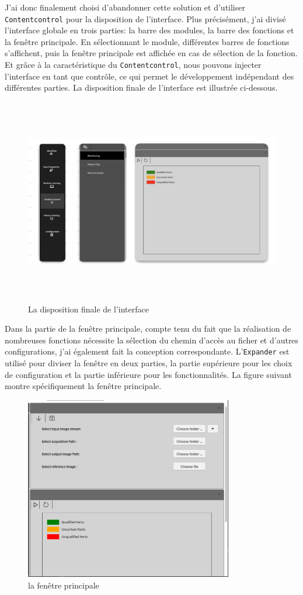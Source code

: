 J'ai donc finalement choisi d'abandonner cette solution et d'utiliser 
\texttt{Contentcontrol} pour la disposition de l'interface. Plus précisément, j'ai divisé l'interface globale en trois parties: la barre des modules, la barre des fonctions et la fenêtre principale. En sélectionnant le module, différentes barres de fonctions s'affichent, puis la fenêtre principale est affichée en cas de sélection de la fonction. Et grâce à la caractéristique du \texttt{Contentcontrol}, nous pouvons injecter l'interface en tant que contrôle, ce qui permet le développement indépendant des différentes parties. La disposition finale de l'interface est illustrée ci-dessous.
\begin{figure}[H]
    \centering
    \includegraphics[height=9cm]{ressources/images/PowerEye_Disposition.jpg}
    \caption{ La disposition finale de l’interface}
\end{figure}

Dans la partie de la fenêtre principale, compte tenu du fait que la réalisation de nombreuses fonctions nécessite la sélection du chemin d'accès au ficher et d'autres configurations, j'ai également fait la conception correspondante. L'\texttt{Expander} est utilisé pour diviser la fenêtre en deux parties, la partie supérieure pour les choix de configuration et la partie inférieure pour les fonctionnalités. La figure suivant montre spécifiquement la fenêtre principale. 
\begin{figure}[H]
    \centering
    \includegraphics[height=8cm]{ressources/images/fenetre_disposition.png}
    \caption{la fenêtre principale}
\end{figure}

